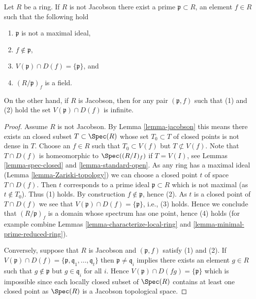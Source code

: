 \begin{lemma}
\label{lemma-characterize-jacobson}
Let $R$ be a ring. If $R$ is not Jacobson there exist
a prime $\mathfrak p \subset R$, an element $f \in R$
such that the following hold
\begin{enumerate}
\item $\mathfrak p$ is not a maximal ideal,
\item $f \not \in \mathfrak p$,
\item $V(\mathfrak p) \cap D(f) = \{\mathfrak p\}$, and
\item $(R/\mathfrak p)_f$ is a field.
\end{enumerate}
On the other hand, if $R$ is Jacobson, then for any pair $(\mathfrak p, f)$
such that (1) and (2) hold the set $V(\mathfrak p) \cap D(f)$ is
infinite.
\end{lemma}

\begin{proof}
Assume $R$ is not Jacobson.
By Lemma \ref{lemma-jacobson} this means there exists an
closed subset $T \subset \Spec(R)$
whose set $T_0 \subset T$ of closed points is not dense in $T$.
Choose an $f \in R$ such that $T_0 \subset V(f)$ but
$T \not \subset V(f)$. Note that $T \cap D(f)$
is homeomorphic to $\Spec((R/I)_f)$ if $T = V(I)$, see
Lemmas \ref{lemma-spec-closed} and \ref{lemma-standard-open}.
As any ring has a maximal ideal
(Lemma \ref{lemma-Zariski-topology}) we can choose a closed point $t$ of
space $T \cap D(f)$. Then $t$ corresponds to a prime ideal
$\mathfrak p \subset R$ which is not maximal (as $t \not \in T_0$).
Thus (1) holds. By construction $f \not \in \mathfrak p$, hence (2).
As $t$ is a closed point of $T \cap D(f)$ we see that
$V(\mathfrak p) \cap D(f) = \{\mathfrak p\}$, i.e., (3) holds. Hence we
conclude that $(R/\mathfrak p)_f$ is a domain whose
spectrum has one point, hence (4) holds
(for example combine Lemmas \ref{lemma-characterize-local-ring} and
\ref{lemma-minimal-prime-reduced-ring}).

\medskip\noindent
Conversely, suppose that $R$ is Jacobson and $(\mathfrak p, f)$
satisfy (1) and (2). If
$V(\mathfrak p) \cap D(f) =
\{\mathfrak p, \mathfrak q_1, \ldots, \mathfrak q_t\}$
then $\mathfrak p \not = \mathfrak q_i$
implies there exists an element $g \in R$ such that $g \not \in \mathfrak p$
but $g \in \mathfrak q_i$ for all $i$. Hence
$V(\mathfrak p) \cap D(fg) = \{\mathfrak p\}$ which
is impossible since each locally closed subset of $\Spec(R)$
contains at least one closed point as $\Spec(R)$ is
a Jacobson topological space.
\end{proof}